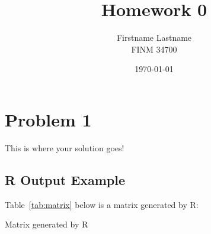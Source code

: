 \documentclass[12pt]{article}
\title{Homework 0}
\author{Firstname Lastname \\ FINM 34700}
\date{\vspace{0.5em} \today}
\begin{document}
\maketitle

\section*{Problem 1}
This is where your solution goes!

\subsection*{R Output Example}
Table~\ref{tab:matrix} below is a matrix generated by R:

\begin{table}[h!]
  \centering
  \caption{Matrix generated by R}
  \label{tab:matrix}
  
\end{table}
\end{document}
